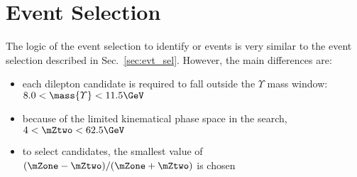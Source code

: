 \section{Event Selection}
\label{sec:evt_sel_dilep}
The logic of the event selection to identify \htozzd or \htozdzd events is very similar to the event selection described in Sec.~\ref{sec:evt_sel}.
However, the main differences are:
\begin{itemize}
    \item each dilepton candidate is required to fall outside the $\varUpsilon$ mass window: $8.0 < \mass{\varUpsilon} < 11.5\GeV$
    \item because of the limited kinematical phase space in the \zdzd search, $4 < \mZtwo < 62.5\GeV$
    \item to select \zdzd candidates, the smallest value of $(\mZone - \mZtwo)/(\mZone + \mZtwo)$ is chosen
\end{itemize}


